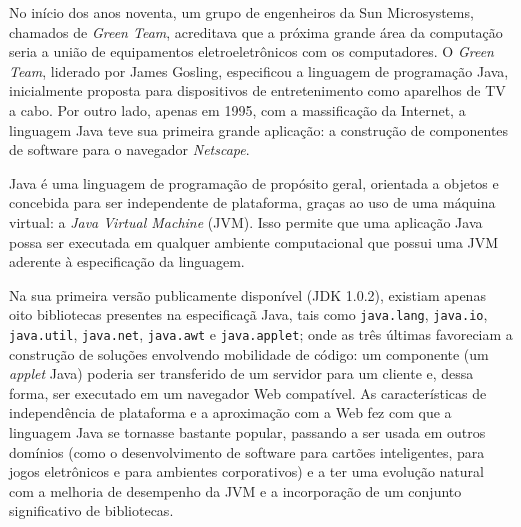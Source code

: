 No in\'{i}cio dos anos noventa, um grupo de engenheiros da 
Sun Microsystems, chamados de \textit{Green Team}, acreditava 
que a pr\'{o}xima grande \'{a}rea da computaç\~{a}o 
seria a uni\~{a}o de equipamentos eletroeletrônicos com os 
computadores. O \textit{Green Team}, liderado por James Gosling, 
especificou a linguagem de programaç\~{a}o Java, 
inicialmente proposta para dispositivos de entretenimento 
como aparelhos de TV a cabo. Por outro lado, apenas em 1995, 
com a massificaç\~{a}o da Internet, a linguagem Java 
teve sua primeira grande aplicaç\~{a}o: a constru\c c\~{a}o 
de componentes de software para o navegador \textit{Netscape}.

Java \'{e} uma linguagem de programaç\~{a}o de prop\'{o}sito geral, 
orientada a objetos e concebida para ser independente de plataforma, 
gra\c cas ao uso de uma m\'{a}quina virtual: a 
\emph{Java Virtual Machine} (JVM). Isso permite 
que uma aplica\c c\~{a}o Java
possa ser executada em qualquer ambiente computacional que possui 
uma JVM aderente \`{a} especifica\c c\~{a}o da linguagem.

Na sua primeira vers\~{a}o publicamente dispon\'{i}vel 
(\acs{JDK} 1.0.2), existiam apenas oito bibliotecas 
presentes na especifica\c c\~{a} Java, tais como 
\texttt{java.lang}, \texttt{java.io}, \texttt{java.util},  
\texttt{java.net}, \texttt{java.awt} e \texttt{java.applet}; 
onde as tr\^{e}s \'{u}ltimas favoreciam a constru\c c\~{a}o de 
solu\c c\~{o}es envolvendo mobilidade de c\'{o}digo:
um componente (um \textit{applet} Java) poderia ser transferido de um 
servidor para um cliente e, dessa forma, 
ser executado em um navegador Web compat\'{i}vel. As caracter\'{i}sticas de 
independ\^{e}ncia de plataforma e a aproxima\c c\~{a}o com a Web fez 
com que a linguagem Java se tornasse bastante popular, passando a ser 
usada em outros dom\'{i}nios (como o desenvolvimento de software 
para cart\~{o}es inteligentes, para jogos eletr\^{o}nicos e para ambientes corporativos) e a ter 
uma evolu\c c\~{a}o natural com a melhoria de desempenho da 
JVM e a incorpora\c c\~{a}o de um conjunto significativo de 
bibliotecas. 


